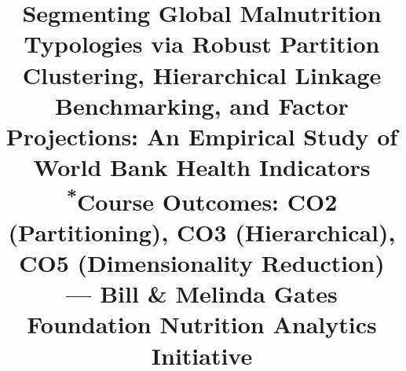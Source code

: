 \documentclass[conference]{IEEEtran}
\begin{document}
\title{Segmenting Global Malnutrition Typologies via Robust Partition Clustering, Hierarchical Linkage Benchmarking, and Factor Projections: An Empirical Study of World Bank Health Indicators\\
{\footnotesize \textsuperscript{*}Course Outcomes: CO2 (Partitioning), CO3 (Hierarchical), CO5 (Dimensionality Reduction) --- Bill \& Melinda Gates Foundation Nutrition Analytics Initiative}
}

\author{
}

\maketitle
\end{document}
